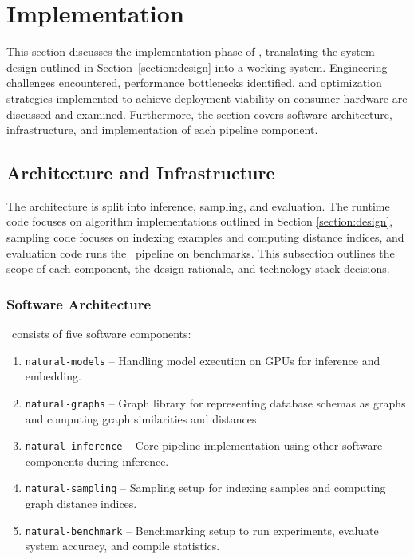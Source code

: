 \section{Implementation}

This section discusses the implementation phase of \Natural, translating the
system design outlined in Section~\ref{section:design} into a working system.
Engineering challenges encountered, performance bottlenecks identified, and
optimization strategies implemented to achieve deployment viability on consumer
hardware are discussed and examined. Furthermore, the section covers software
architecture, infrastructure, and implementation of each pipeline component.

\subsection{Architecture and Infrastructure}

The architecture is split into inference, sampling, and evaluation. The
runtime code focuses on algorithm implementations outlined in Section
\ref{section:design}, sampling code focuses on indexing examples and computing
distance indices, and evaluation code runs the \Natural~pipeline on benchmarks.
This subsection outlines the scope of each component, the design rationale, and
technology stack decisions.

\subsubsection{Software Architecture}

\Natural~consists of five software components:

\begin{enumerate}
    \item \texttt{natural-models} – Handling model execution on GPUs for
        inference and embedding.
    \item \texttt{natural-graphs} – Graph library for representing
        database schemas as graphs and computing graph similarities and
        distances.
    \item \texttt{natural-inference} – Core pipeline implementation using
        other software components during inference.
    \item \texttt{natural-sampling} – Sampling setup for
        indexing samples and computing graph distance indices.
    \item \texttt{natural-benchmark} – Benchmarking setup to run
        experiments, evaluate system accuracy, and
        compile statistics.
\end{enumerate}


